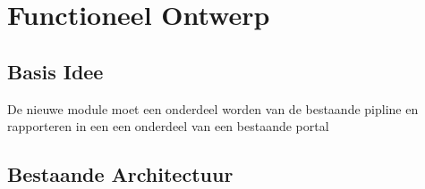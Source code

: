 
\chapter{Functioneel Ontwerp} %

\label{funtioneelOntwerp} %

\section{Basis Idee}
De nieuwe module moet een onderdeel worden van de bestaande pipline en rapporteren in een een onderdeel van een bestaande portal

\section{Bestaande Architectuur}
